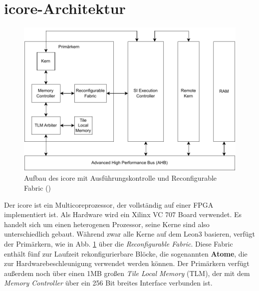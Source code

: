 \section{icore-Architektur}
\begin{figure}
    \center
    \includegraphics{images/Icore_Arch.pdf}
    \caption{Aufbau des icore mit Ausführungskontrolle und Reconfigurable Fabric ()}
    \label{fig:icore_arch}
\end{figure}
\label{sec:icore_arch}
Der icore ist ein Multicoreprozessor, der vollständig auf einer FPGA implementiert ist. Als Hardware wird ein Xilinx VC 707 Board verwendet.
Es handelt sich um einen heterogenen Prozessor, seine Kerne sind also unterschiedlich gebaut. Während zwar alle Kerne auf dem Leon3 basieren,
verfügt der Primärkern, wie in Abb. \ref{fig:icore_arch} über die \textit{Reconfigurable Fabric}.
Diese Fabric enthält fünf zur Laufzeit rekonfigurierbare Blöcke, die sogenannten \textbf{Atome}, die zur Hardwarebeschleunigung verwendet werden können.
Der Primärkern verfügt außerdem noch über einen 1MB großen \textit{Tile Local Memory} (TLM), der mit dem \textit{Memory Controller} über ein 256 Bit breites Interface verbunden ist.

